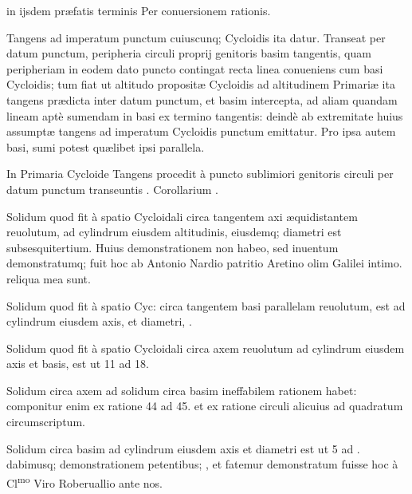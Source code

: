 \documentclass[11pt,a4paper]{article}
\begin{document}
in ijsdem præfatis terminis Per conuersionem rationis.

Tangens ad imperatum punctum cuiuscunq; Cycloidis ita datur. Transeat per datum punctum, peripheria circuli proprij genitoris basim tangentis, quam peripheriam in eodem dato puncto contingat recta linea conueniens cum basi Cycloidis; tum fiat ut altitudo propositæ Cycloidis ad altitudinem Primariæ ita tangens prædicta inter datum punctum, et basim intercepta, ad aliam quandam lineam aptè sumendam in basi ex termino tangentis: deindè ab extremitate huius assumptæ tangens ad imperatum Cycloidis punctum emittatur. Pro ipsa autem basi, sumi potest quælibet ipsi parallela.

In Primaria Cycloide Tangens procedit à puncto sublimiori genitoris circuli per datum punctum transeuntis . Corollarium .

Solidum quod fit à spatio Cycloidali circa tangentem axi æquidistantem reuolutum, ad cylindrum eiusdem altitudinis, eiusdemq; diametri est subsesquitertium. Huius demonstrationem non habeo, sed inuentum demonstratumq; fuit hoc ab Antonio Nardio patritio Aretino olim Galilei intimo. reliqua mea sunt.

Solidum quod fit à spatio Cyc: circa tangentem basi parallelam reuolutum, est ad cylindrum eiusdem axis, et diametri, .

Solidum quod fit à spatio Cycloidali circa axem reuolutum ad cylindrum eiusdem axis et basis, est ut 11 ad 18.

Solidum circa axem ad solidum circa basim ineffabilem rationem habet: componitur enim ex ratione 44 ad 45. et ex ratione circuli alicuius ad quadratum circumscriptum.

Solidum circa basim ad cylindrum eiusdem axis et diametri est ut 5 ad . dabimusq; demonstrationem petentibus; , et fatemur demonstratum fuisse hoc à Cl\textsuperscript{mo} Viro Roberuallio ante nos.
\end{document}
